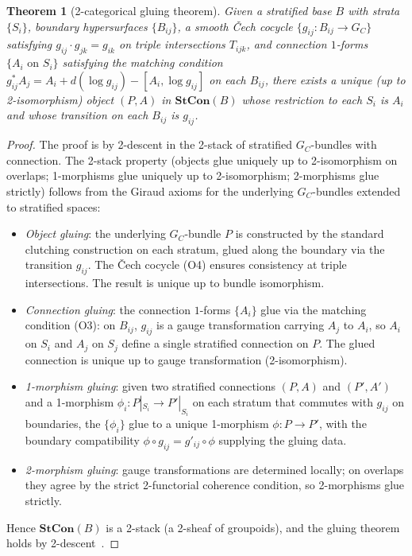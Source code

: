 \documentclass[11pt,a4paper]{article}
\theoremstyle{plain}
\newtheorem{theorem}{Theorem}[section]
\theoremstyle{definition}
\theoremstyle{remark}
\begin{document}
\begin{theorem}[2-categorical gluing theorem]
\label{thm:2cat-gluing}
Given a stratified base $B$ with strata $\{S_i\}$, boundary hypersurfaces
$\{B_{ij}\}$, a smooth Čech cocycle $\{g_{ij} : B_{ij} \to G_C\}$
satisfying $g_{ij} \cdot g_{jk} = g_{ik}$ on triple intersections
$T_{ijk}$, and connection $1$-forms $\{A_i \text{ on } S_i\}$ satisfying
the matching condition $g_{ij}^* A_j = A_i + d(\log g_{ij}) - [A_i, \log
g_{ij}]$ on each $B_{ij}$, there exists a unique (up to 2-isomorphism)
object $(P, A)$ in $\mathbf{StCon}(B)$ whose restriction to each $S_i$
is $A_i$ and whose transition on each $B_{ij}$ is $g_{ij}$.
\end{theorem}

\begin{proof}
The proof is by 2-descent in the 2-stack of stratified $G_C$-bundles with
connection. The 2-stack property (objects glue uniquely up to
2-isomorphism on overlaps; 1-morphisms glue uniquely up to 2-isomorphism;
2-morphisms glue strictly) follows from the Giraud axioms for the
underlying $G_C$-bundles extended to stratified spaces:
\begin{itemize}[leftmargin=*,itemsep=2pt]
\item \emph{Object gluing}: the underlying $G_C$-bundle $P$ is constructed
  by the standard clutching construction on each stratum, glued along the
  boundary via the transition $g_{ij}$. The Čech cocycle (O4) ensures
  consistency at triple intersections. The result is unique up to
  bundle isomorphism.
\item \emph{Connection gluing}: the connection $1$-forms $\{A_i\}$ glue
  via the matching condition (O3): on $B_{ij}$, $g_{ij}$ is a gauge
  transformation carrying $A_j$ to $A_i$, so $A_i$ on $S_i$ and $A_j$
  on $S_j$ define a single stratified connection on $P$. The glued
  connection is unique up to gauge transformation (2-isomorphism).
\item \emph{1-morphism gluing}: given two stratified connections $(P, A)$
  and $(P', A')$ and a 1-morphism $\phi_i : P|_{S_i} \to P'|_{S_i}$ on
  each stratum that commutes with $g_{ij}$ on boundaries, the
  $\{\phi_i\}$ glue to a unique 1-morphism $\phi : P \to P'$, with the
  boundary compatibility $\phi \circ g_{ij} = g'_{ij} \circ \phi$
  supplying the gluing data.
\item \emph{2-morphism gluing}: gauge transformations are determined
  locally; on overlaps they agree by the strict 2-functorial coherence
  condition, so 2-morphisms glue strictly.
\end{itemize}
Hence $\mathbf{StCon}(B)$ is a 2-stack (a 2-sheaf of groupoids), and the
gluing theorem holds by 2-descent~\cite{giraud1971cohomologie,breen1994classification,breen2001gerbes,bartels2007higher}.
\end{proof}
\end{document}
